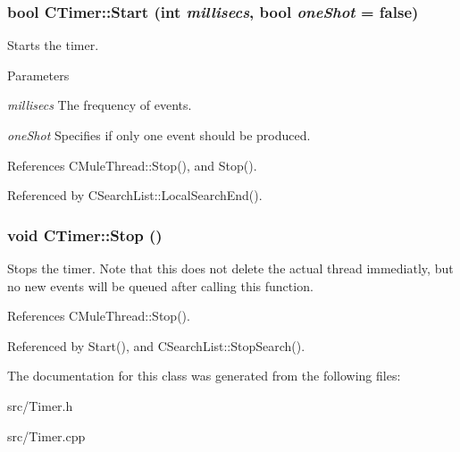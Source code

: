 \subsubsection[{Start}]{\setlength{\rightskip}{0pt plus 5cm}bool CTimer::Start (int {\em millisecs}, \/  bool {\em oneShot} = {\ttfamily false})}\label{classCTimer_a5a4c96a780bce76147f55629c440f563}


Starts the timer. 
\begin{DoxyParams}{Parameters}
\item[{\em millisecs}]The frequency of events. \item[{\em oneShot}]Specifies if only one event should be produced. \end{DoxyParams}


References CMuleThread::Stop(), and Stop().

Referenced by CSearchList::LocalSearchEnd().
\subsubsection[{Stop}]{\setlength{\rightskip}{0pt plus 5cm}void CTimer::Stop ()}\label{classCTimer_a7fe9ad152f641589251afdabebd60572}


Stops the timer. Note that this does not delete the actual thread immediatly, but no new events will be queued after calling this function. 

References CMuleThread::Stop().

Referenced by Start(), and CSearchList::StopSearch().

The documentation for this class was generated from the following files:\begin{DoxyCompactItemize}
\item 
src/Timer.h\item 
src/Timer.cpp\end{DoxyCompactItemize}
